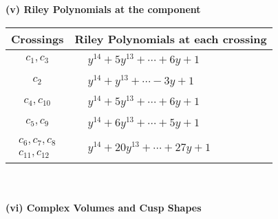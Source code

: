 \documentclass[1p]{elsarticle_modified}
\theoremstyle{definition}
\begin{document}
\newpage\renewcommand{\arraystretch}{1}
\flushleft \textbf{(v) Riley Polynomials at the component}\newline \\
\begin{tabular}{m{50pt}|m{274pt}}
Crossings & \hspace{64pt}Riley Polynomials at each crossing \\
\hline $$\begin{aligned}c_{1},c_{3}\end{aligned}$$&$\begin{aligned}
&y^{14}+5 y^{13}+\cdots+6 y+1
\end{aligned}$\\
\hline $$\begin{aligned}c_{2}\end{aligned}$$&$\begin{aligned}
&y^{14}+y^{13}+\cdots-3 y+1
\end{aligned}$\\
\hline $$\begin{aligned}c_{4},c_{10}\end{aligned}$$&$\begin{aligned}
&y^{14}+5 y^{13}+\cdots+6 y+1
\end{aligned}$\\
\hline $$\begin{aligned}c_{5},c_{9}\end{aligned}$$&$\begin{aligned}
&y^{14}+6 y^{13}+\cdots+5 y+1
\end{aligned}$\\
\hline $$\begin{aligned}c_{6},c_{7},c_{8}\\c_{11},c_{12}\end{aligned}$$&$\begin{aligned}
&y^{14}+20 y^{13}+\cdots+27 y+1
\end{aligned}$\\
\hline
\end{tabular}\\~\\
\newpage\flushleft \textbf{(vi) Complex Volumes and Cusp Shapes}
\end{document}
